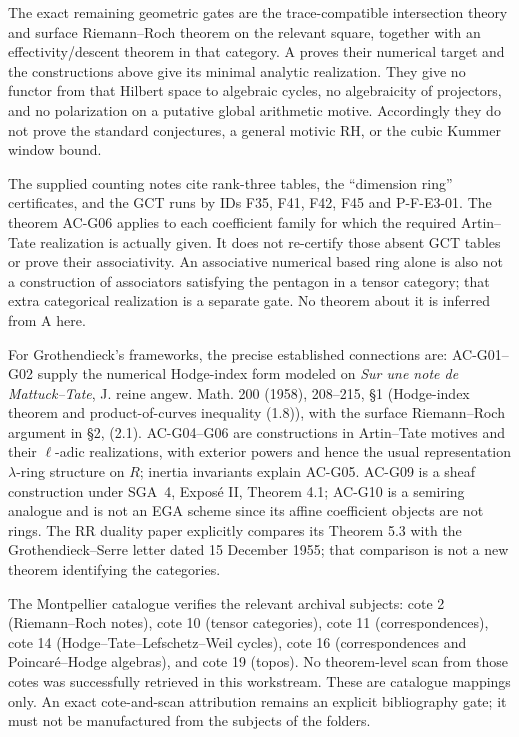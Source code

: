 The exact remaining geometric gates are the trace-compatible
intersection theory and surface Riemann--Roch theorem on the relevant
square, together with an effectivity/descent theorem in that category.
A proves their numerical target and the constructions above give its
minimal analytic realization.  They give no functor from that Hilbert
space to algebraic cycles, no algebraicity of projectors, and no
polarization on a putative global arithmetic motive.  Accordingly they
do not prove the standard conjectures, a general motivic RH, or the
cubic Kummer window bound.

The supplied counting notes cite rank-three tables, the ``dimension
ring'' certificates, and the GCT runs by IDs F35, F41, F42, F45 and
P-F-E3-01.  The theorem AC-G06 applies to each coefficient family for
which the required Artin--Tate realization is actually given.  It does
not re-certify those absent GCT tables or prove their associativity.
An associative numerical based ring alone is also not a construction of
associators satisfying the pentagon in a tensor category; that extra
categorical realization is a separate gate.  No theorem about it is
inferred from A here.

For Grothendieck's frameworks, the precise established connections are:
AC-G01--G02 supply the numerical Hodge-index form modeled on
\emph{Sur une note de Mattuck--Tate}, J. reine angew. Math. 200 (1958),
208--215, \S1 (Hodge-index theorem and product-of-curves inequality
(1.8)), with the surface Riemann--Roch argument in \S2, (2.1).
AC-G04--G06 are constructions in Artin--Tate motives and their
$\ell$-adic realizations, with exterior powers and hence the usual
representation $\lambda$-ring structure on $R$; inertia invariants
explain AC-G05.  AC-G09 is a sheaf construction under SGA~4,
Expos\'e II, Theorem 4.1; AC-G10 is a semiring analogue and is not an
EGA scheme since its affine coefficient objects are not rings.
The RR duality paper explicitly compares its Theorem 5.3 with the
Grothendieck--Serre letter dated 15 December 1955; that comparison is
not a new theorem identifying the categories.

The Montpellier catalogue verifies the relevant archival subjects:
cote 2 (Riemann--Roch notes), cote 10 (tensor categories), cote 11
(correspondences), cote 14 (Hodge--Tate--Lefschetz--Weil cycles), cote 16
(correspondences and Poincar\'e--Hodge algebras), and cote 19 (topos).
No theorem-level scan from those cotes was successfully retrieved in
this workstream.  These are catalogue mappings only.  An exact
cote-and-scan attribution remains an explicit bibliography gate; it
must not be manufactured from the subjects of the folders.
